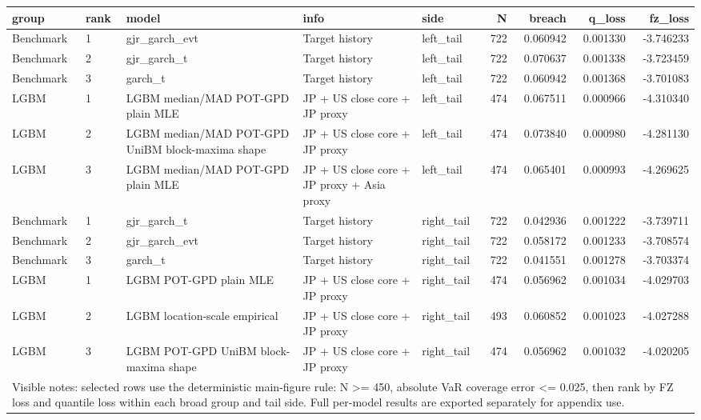\begin{tabular}{ll ll lrrrr}
\toprule
group & rank & model & info & side & N & breach & q_loss & fz_loss \\
\midrule
Benchmark & 1 & gjr\_garch\_evt & Target history & left\_tail & 722 & 0.060942 & 0.001330 & -3.746233 \\
Benchmark & 2 & gjr\_garch\_t & Target history & left\_tail & 722 & 0.070637 & 0.001338 & -3.723459 \\
Benchmark & 3 & garch\_t & Target history & left\_tail & 722 & 0.060942 & 0.001368 & -3.701083 \\
LGBM & 1 & LGBM median/MAD POT-GPD plain MLE & JP + US close core + JP proxy & left\_tail & 474 & 0.067511 & 0.000966 & -4.310340 \\
LGBM & 2 & LGBM median/MAD POT-GPD UniBM block-maxima shape & JP + US close core + JP proxy & left\_tail & 474 & 0.073840 & 0.000980 & -4.281130 \\
LGBM & 3 & LGBM median/MAD POT-GPD plain MLE & JP + US close core + JP proxy + Asia proxy & left\_tail & 474 & 0.065401 & 0.000993 & -4.269625 \\
Benchmark & 1 & gjr\_garch\_t & Target history & right\_tail & 722 & 0.042936 & 0.001222 & -3.739711 \\
Benchmark & 2 & gjr\_garch\_evt & Target history & right\_tail & 722 & 0.058172 & 0.001233 & -3.708574 \\
Benchmark & 3 & garch\_t & Target history & right\_tail & 722 & 0.041551 & 0.001278 & -3.703374 \\
LGBM & 1 & LGBM POT-GPD plain MLE & JP + US close core + JP proxy & right\_tail & 474 & 0.056962 & 0.001034 & -4.029703 \\
LGBM & 2 & LGBM location-scale empirical & JP + US close core + JP proxy & right\_tail & 493 & 0.060852 & 0.001023 & -4.027288 \\
LGBM & 3 & LGBM POT-GPD UniBM block-maxima shape & JP + US close core + JP proxy & right\_tail & 474 & 0.056962 & 0.001032 & -4.020205 \\
\midrule
\multicolumn{9}{l}{\footnotesize Visible notes: selected rows use the deterministic main-figure rule: N >= 450, absolute VaR coverage error <= 0.025, then rank by FZ loss and quantile loss within each broad group and tail side. Full per-model results are exported separately for appendix use.} \\
\bottomrule
\end{tabular}
